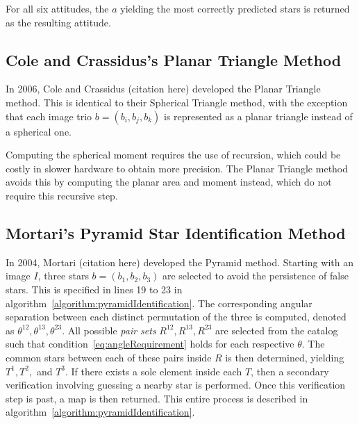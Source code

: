 For all six attitudes, the $a$ yielding the most correctly predicted stars is returned as the resulting attitude.

\subsection{Cole and Crassidus's Planar Triangle Method}\label{subsec:coleAndCrassidus'sPlanarTriangleMethod}
In 2006, Cole and Crassidus (citation here) developed the Planar Triangle method.
This is identical to their Spherical Triangle method, with the exception that each image trio $b = (b_i, b_j, b_k)$
is represented as a planar triangle instead of a spherical one.

Computing the spherical moment requires the use of recursion, which could be costly in slower hardware to obtain more
precision.
The Planar Triangle method avoids this by computing the planar area and moment instead, which do not require this
recursive step.

\subsection{Mortari's Pyramid Star Identification Method}\label{subsec:mortari'sPyramidStarIdentificationMethod}
In 2004, Mortari (citation here) developed the Pyramid method.
Starting with an image $I$, three stars $b = (b_1, b_2, b_3)$ are selected to avoid the persistence of false stars.
This is specified in lines 19 to 23 in algorithm~\ref{algorithm:pyramidIdentification}.
The corresponding angular separation between each distinct permutation of the three is computed, denoted as
$\theta^{12}, \theta^{13}, \theta^{23}$.
All possible \textit{pair sets} $R^{12}, R^{13}, R^{23}$ are selected from the catalog such that
condition~\eqref{eq:angleRequirement} holds for each respective $\theta$.
The common stars between each of these pairs inside $R$ is then determined, yielding $T^1, T^2, $ and $T^3$.
If there exists a sole element inside each $T$, then a secondary verification involving guessing a nearby star is
performed.
Once this verification step is past, a map is then returned.
This entire process is described in algorithm~\ref{algorithm:pyramidIdentification}.

